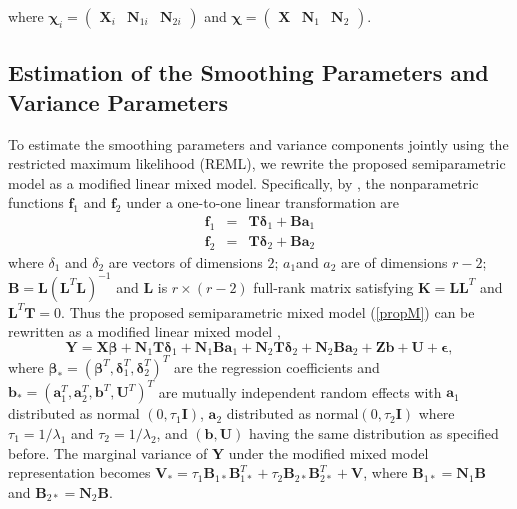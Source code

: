 \documentclass[review]{elsarticle}
\begin{document}
where 
$
\boldsymbol \chi_i 
=
\begin{pmatrix}
\boldsymbol X_i & \boldsymbol N_{1i} & \boldsymbol N_{2i}
\end{pmatrix}
$
and
$
\boldsymbol \chi 
=
\begin{pmatrix}
\boldsymbol X & \boldsymbol N_1 & \boldsymbol N_2
\end{pmatrix}.
$

\subsection{Estimation of the Smoothing Parameters and Variance Parameters} \label{estSmoo}

To estimate the smoothing parameters and variance components jointly using the restricted maximum likelihood (REML), we rewrite the proposed semiparametric model as a modified linear mixed model. Specifically, by \cite{Green:1987}, the nonparametric functions $\boldsymbol f_1$ and $\boldsymbol f_2$ under a one-to-one linear transformation are 
\begin{eqnarray*}
\bm f_1 &=& \bm T \bm \delta_1 + \bm B \bm a_1 \\
\bm f_2 &=& \bm T \bm \delta_2 + \bm B \bm a_2 
\end{eqnarray*}
where $\delta_1$ and  $\delta_2$ are vectors of dimensions $2$;  $a_1$and $a_2$ are of dimensions $r-2$;
$\bm B = \bm L (\bm L^T \bm L)^{-1}$ and $\bm L$ is $r \times (r-2)$ full-rank matrix satisfying $\bm K = \bm L \bm L^T$ and $\bm L^T \bm T = 0$. 
Thus the proposed semiparametric mixed model (\ref{propM}) can be rewritten as a modified linear mixed model \citep {Zhang:1998}, 
\begin{equation} \label{modLME}
\bm Y = \bm X \bm \beta 
+ \bm N_1 \bm T \bm \delta_1 + \bm N_1 \bm B \bm a_1
+ \bm N_2 \bm T \bm \delta_2 + \bm N_2 \bm B \boldsymbol a_2
+ \bm Z \bm b + \bm U + \bm \epsilon,
\end{equation}
where $\bm \beta_* = (\bm \beta^T, \bm \delta_1^T, \bm \delta_2^T)^T$ are the regression coefficients and 
$\boldsymbol b_* = (\bm a_1^T,  \bm a_2^T, \bm b^T, \bm U^T)^T$  are mutually independent random effects with $\bm a_1$ distributed as normal
$(0, \tau_1 \bm I)$,
$\bm a_2$ distributed as normal$(0, \tau_2 \bm I)$ where $\tau_1 = 1/\lambda_1$ and $\tau_2 = 1/\lambda_2$, and $(\bm b, \bm U)$ having the same distribution as specified before. 
The marginal variance of $\boldsymbol Y$ under the modified mixed model representation becomes 
$\boldsymbol V_* = \tau_1 \boldsymbol B_{1*} \boldsymbol B_{1*}^T +  \tau_2 \boldsymbol B_{2*} \boldsymbol B_{2*}^T + \boldsymbol V$, 
where 
$\boldsymbol B_{1*} = \boldsymbol N_1 \boldsymbol B$
and 
$\boldsymbol B_{2*} = \boldsymbol N_2 \boldsymbol B$.
\end{document}

